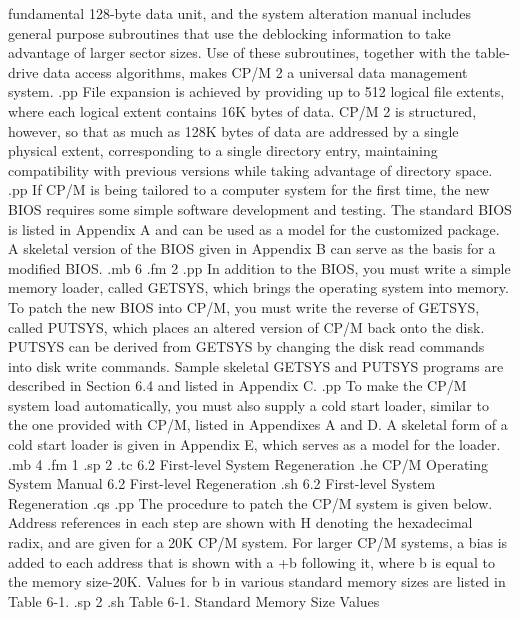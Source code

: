 fundamental 128-byte data unit, and the system alteration manual 
includes general purpose subroutines that use the deblocking 
information to take advantage of larger sector sizes.  Use of 
these subroutines, together with the table-drive data access 
algorithms, makes CP/M 2 a universal data management system.
.pp
File expansion is achieved by providing up to 512 logical file 
extents, where each logical extent contains 16K bytes of data.  
CP/M 2 is structured, however, so that as much as 128K bytes of 
data are addressed by a single physical extent, corresponding to a 
single directory entry, maintaining compatibility with previous 
versions while taking advantage of directory space.
.pp
If CP/M is being tailored to a computer system for the first 
time, the new BIOS requires some simple software development and 
testing.  The standard BIOS is listed in Appendix A and can be 
used as a model for the customized package.  A skeletal version 
of the BIOS given in Appendix B can serve as the basis for a 
modified BIOS.  
.mb 6
.fm 2
.pp
In addition to the BIOS, you must write a simple memory 
loader, called GETSYS, which brings the operating system into 
memory.  To patch the new BIOS into CP/M, you must write the 
reverse of GETSYS, called PUTSYS, which places an altered version 
of CP/M back onto the disk.  PUTSYS can be derived from GETSYS by 
changing the disk read commands into disk write commands.  Sample 
skeletal GETSYS and PUTSYS programs are described in Section 6.4 
and listed in Appendix C.  
.pp
To make the CP/M system load automatically, you must also 
supply a cold start loader, similar to the one provided with 
CP/M, listed in Appendixes A and D.  A skeletal form of a cold 
start loader is given in Appendix E, which serves as a model for 
the loader.
.mb 4
.fm 1
.sp 2
.tc    6.2  First-level System Regeneration
.he CP/M Operating System Manual        6.2  First-level Regeneration
.sh
6.2  First-level System Regeneration
.qs
.pp
The procedure to patch the CP/M system is given below.  Address 
references in each step are shown with H denoting the 
hexadecimal radix, and are given for a 20K CP/M system.  For 
larger CP/M systems, a bias is added to each address that is 
shown with a +b following it, where b is equal to the memory 
size-20K.  Values for b in various standard memory sizes are listed in 
Table 6-1.
.sp 2
.sh
             Table 6-1.  Standard Memory Size Values

